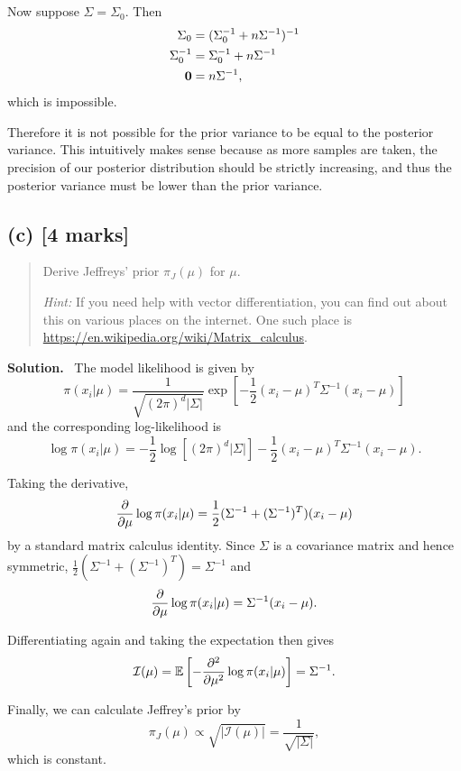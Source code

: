 \documentclass{article}
\newcommand{\E}{\mathbb{E}}
\newenvironment{question}{\begin{quote}\small}{\end{quote}}
\newcommand{\solution}{\noindent\textbf{Solution.}\ }
\begin{document}
Now suppose $\hat\Sigma = \Sigma_0$.
Then
\begin{align*}
    \Sigma_0 &= (\Sigma_0^{-1} + n\Sigma^{-1})^{-1} \\
    \Sigma_0^{-1} &= \Sigma_0^{-1} + n\Sigma^{-1} \\
    \vb{0} &= n\Sigma^{-1},
\end{align*}
which is impossible.

Therefore it is not possible for the prior variance to be equal to the posterior variance. This intuitively makes sense because as more samples are taken, the precision of our posterior distribution should be strictly increasing, and thus the posterior variance must be lower than the prior variance.

\subsection*{(c) [4 marks]}

\begin{question}
Derive Jeffreys' prior $\pi_J(\mu)$ for $\mu$.

\emph{Hint:} If you need help with vector differentiation, you can find out about this on various places on the internet. One such place is \url{https://en.wikipedia.org/wiki/Matrix_calculus}.
\end{question}

\solution
The model likelihood is given by
\[
    \pi(x_i|\mu) = \frac{1}{\sqrt{(2\pi)^d |\Sigma|}} \exp[-\frac12 (x_i - \mu)^T \Sigma^{-1} (x_i - \mu)]
\]
and the corresponding log-likelihood is
\[
    \log \pi(x_i|\mu) = -\frac12 \log[(2\pi)^d |\Sigma|] - \frac12 (x_i - \mu)^T \Sigma^{-1} (x_i - \mu).
\]

Taking the derivative,
\[
    \pdv{\mu} \log \pi(x_i|\mu) = \frac12 (\Sigma^{-1} + (\Sigma^{-1})^T) (x_i - \mu)
\]
by a standard matrix calculus identity.
Since $\Sigma$ is a covariance matrix and hence symmetric, $\frac12 (\Sigma^{-1} + (\Sigma^{-1})^T) = \Sigma^{-1}$ and
\[
    \pdv{\mu} \log \pi(x_i|\mu) = \Sigma^{-1} (x_i - \mu).
\]

Differentiating again and taking the expectation then gives
\[
    \mathcal{I}(\mu) = \E\left[-\pdv[2]{\mu} \log \pi(x_i|\mu) \right] = \Sigma^{-1}.
\]

Finally, we can calculate Jeffrey's prior by
\[
    \pi_J(\mu) \propto \sqrt{|\mathcal{I}(\mu)|} = \frac{1}{\sqrt{|\Sigma|}},
\]
which is constant.
\end{document}
